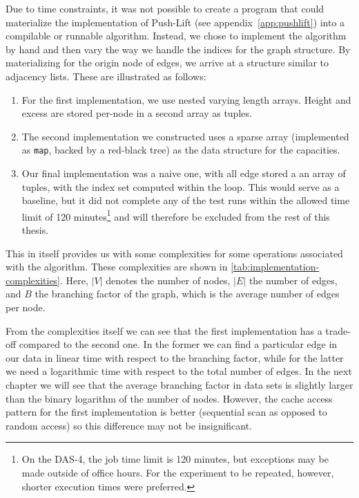 Due to time constraints, it was not possible to create a program that could materialize the \forelem implementation of Push-Lift (see appendix~\ref{app:pushlift}) into a compilable or runnable algorithm. Instead, we chose to implement the algorithm by hand and then vary the way we handle the indices for the graph structure. By materializing for the origin node of edges, we arrive at a structure similar to adjacency lists. These are illustrated as follows:

\begin{enumerate}
	\item For the first implementation, we use nested varying length arrays. Height and excess are stored per-node in a second array as tuples.
	\item The second implementation we constructed uses a sparse array (implemented as \texttt{map}, backed by a red-black tree) as the data structure for the capacities.
	\item Our final implementation was a naive one, with all edge stored a an array of tuples, with the index set computed within the loop. This would serve as a baseline, but it did not complete any of the test runs within the allowed time limit of 120 minutes\footnote{On the DAS-4, the job time limit is 120 minutes, but exceptions may be made outside of office hours. For the experiment to be repeated, however, shorter execution times were preferred.} and will therefore be excluded from the rest of this thesis.
\end{enumerate}

This in itself provides us with some complexities for some operations associated with the algorithm. These complexities are shown in \autoref{tab:implementation-complexities}. Here, $|V|$ denotes the number of nodes, $|E|$ the number of edges, and $B$ the branching factor of the graph, which is the average number of edges per node.

From the complexities itself we can see that the first implementation has a trade-off compared to the second one. In the former we can find a particular edge in our data in linear time with respect to the branching factor, while for the latter we need a logarithmic time with respect to the total number of edges. In the next chapter we will see that the average branching factor in data sets is slightly larger than the binary logarithm of the number of nodes.  However, the cache access pattern for the first implementation is better (sequential scan as opposed to random access) so this difference may not be insignificant.

